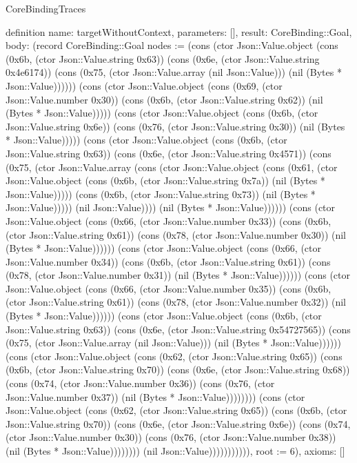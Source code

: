 \begin{lexlean}{CoreBindingTraces}
\begin{semanticmodule}
definition{
 name: targetWithoutContext,
 parameters: [],
 result: CoreBinding::Goal,
 body: (record CoreBinding::Goal {nodes := (cons (ctor Json::Value.object (cons (0x6b, (ctor Json::Value.string 0x63)) (cons (0x6e, (ctor Json::Value.string 0x4e6174)) (cons (0x75, (ctor Json::Value.array (nil Json::Value))) (nil (Bytes * Json::Value)))))) (cons (ctor Json::Value.object (cons (0x69, (ctor Json::Value.number 0x30)) (cons (0x6b, (ctor Json::Value.string 0x62)) (nil (Bytes * Json::Value))))) (cons (ctor Json::Value.object (cons (0x6b, (ctor Json::Value.string 0x6e)) (cons (0x76, (ctor Json::Value.string 0x30)) (nil (Bytes * Json::Value))))) (cons (ctor Json::Value.object (cons (0x6b, (ctor Json::Value.string 0x63)) (cons (0x6e, (ctor Json::Value.string 0x4571)) (cons (0x75, (ctor Json::Value.array (cons (ctor Json::Value.object (cons (0x61, (ctor Json::Value.object (cons (0x6b, (ctor Json::Value.string 0x7a)) (nil (Bytes * Json::Value))))) (cons (0x6b, (ctor Json::Value.string 0x73)) (nil (Bytes * Json::Value))))) (nil Json::Value)))) (nil (Bytes * Json::Value)))))) (cons (ctor Json::Value.object (cons (0x66, (ctor Json::Value.number 0x33)) (cons (0x6b, (ctor Json::Value.string 0x61)) (cons (0x78, (ctor Json::Value.number 0x30)) (nil (Bytes * Json::Value)))))) (cons (ctor Json::Value.object (cons (0x66, (ctor Json::Value.number 0x34)) (cons (0x6b, (ctor Json::Value.string 0x61)) (cons (0x78, (ctor Json::Value.number 0x31)) (nil (Bytes * Json::Value)))))) (cons (ctor Json::Value.object (cons (0x66, (ctor Json::Value.number 0x35)) (cons (0x6b, (ctor Json::Value.string 0x61)) (cons (0x78, (ctor Json::Value.number 0x32)) (nil (Bytes * Json::Value)))))) (cons (ctor Json::Value.object (cons (0x6b, (ctor Json::Value.string 0x63)) (cons (0x6e, (ctor Json::Value.string 0x54727565)) (cons (0x75, (ctor Json::Value.array (nil Json::Value))) (nil (Bytes * Json::Value)))))) (cons (ctor Json::Value.object (cons (0x62, (ctor Json::Value.string 0x65)) (cons (0x6b, (ctor Json::Value.string 0x70)) (cons (0x6e, (ctor Json::Value.string 0x68)) (cons (0x74, (ctor Json::Value.number 0x36)) (cons (0x76, (ctor Json::Value.number 0x37)) (nil (Bytes * Json::Value)))))))) (cons (ctor Json::Value.object (cons (0x62, (ctor Json::Value.string 0x65)) (cons (0x6b, (ctor Json::Value.string 0x70)) (cons (0x6e, (ctor Json::Value.string 0x6e)) (cons (0x74, (ctor Json::Value.number 0x30)) (cons (0x76, (ctor Json::Value.number 0x38)) (nil (Bytes * Json::Value)))))))) (nil Json::Value))))))))))), root := 6}),
 axioms: []
}


\end{semanticmodule}
\end{lexlean}
